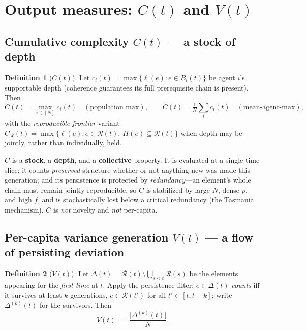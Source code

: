 \documentclass[11pt,letterpaper]{article}
\theoremstyle{definition}
\newtheorem{definition}{Definition}[section]
\theoremstyle{plain}
\newcommand{\R}{\mathcal{R}}
\newcommand{\clo}{\Pi}
\newcommand{\card}[1]{\lvert #1 \rvert}
\begin{document}
\section{Output measures: $C(t)$ and $V(t)$}\label{sec:outputs}

\subsection{Cumulative complexity $C(t)$ --- a stock of depth}

\begin{definition}[$C(t)$]\label{def:C}
Let $c_i(t) = \max\{\ell(e) : e\in B_i(t)\}$ be agent $i$'s supportable depth
(coherence guarantees its full prerequisite chain is present). Then
\begin{equation}
  C(t) = \max_{i\in[N]} c_i(t) \quad(\text{population max}), \qquad
  \bar C(t) = \tfrac1N\textstyle\sum_i c_i(t)\quad(\text{mean-agent-max}),
\end{equation}
with the \emph{reproducible-frontier} variant
$C_{\R}(t)=\max\{\ell(e): e\in\R(t),\ \clo(e)\subseteq\R(t)\}$ when depth may be
jointly, rather than individually, held.
\end{definition}

$C$ is a \textbf{stock}, a \textbf{depth}, and a \textbf{collective} property. It
is evaluated at a single time slice; it counts \emph{preserved} structure whether
or not anything new was made this generation; and its persistence is protected by
\emph{redundancy}---an element's whole chain must remain jointly reproducible, so
$C$ is stabilized by large $N$, dense $\rho$, and high $f$, and is stochastically
lost below a critical redundancy (the Tasmania mechanism). $C$ is \emph{not}
novelty and \emph{not} per-capita.

\subsection{Per-capita variance generation $V(t)$ --- a flow of persisting deviation}

\begin{definition}[$V(t)$]\label{def:V}
Let $\Delta(t) = \R(t)\setminus\bigcup_{s<t}\R(s)$ be the elements appearing for
the \emph{first time} at $t$. Apply the persistence filter: $e\in\Delta(t)$
\emph{counts} iff it survives at least $k$ generations, $e\in\R(t')$ for all
$t'\in[t,t{+}k]$; write $\Delta^{(k)}(t)$ for the survivors. Then
\begin{equation}
  V(t) \;=\; \frac{\card{\Delta^{(k)}(t)}}{N}.
\end{equation}
\end{definition}
\end{document}
